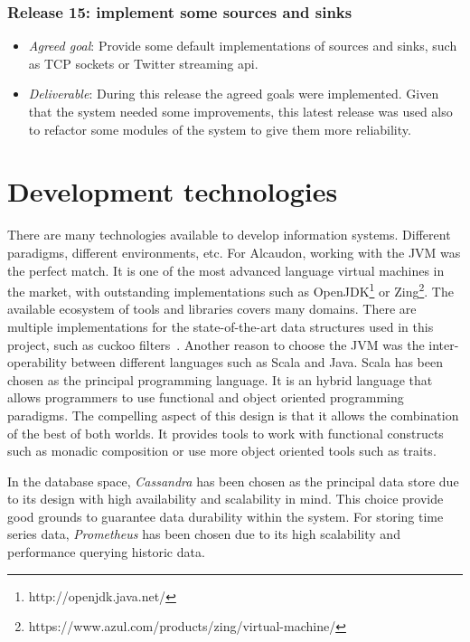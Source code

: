 \subsubsection{Release 15: implement some sources and sinks}
\begin{itemize}
\item \textit{Agreed goal}: Provide some default implementations of sources and
  sinks, such as TCP sockets or Twitter streaming api.
\item \textit{Deliverable}: During this release the agreed goals were implemented. Given
  that the system needed some improvements, this latest release was used also to refactor
  some modules of the system to give them more reliability.
\end{itemize}

\section{Development technologies}

There are many technologies available to develop information systems. Different
paradigms, different environments, etc. For Alcaudon, working with the \acs{JVM}
was the perfect match. It is one of the most advanced language virtual machines
in the market, with outstanding implementations such as
OpenJDK\footnote{http://openjdk.java.net/} or
Zing\footnote{https://www.azul.com/products/zing/virtual-machine/}. The
available ecosystem of tools and libraries covers many domains. There are
multiple implementations for the state-of-the-art data structures used in this
project, such as cuckoo filters~\cite{cuckoo}. Another reason to choose the \acs{JVM}
was the inter-operability between different languages such as Scala and Java.
Scala has been chosen as the principal programming language. It is an hybrid
language that allows programmers to use functional and object oriented
programming paradigms. The compelling aspect of this design is that it allows
the combination of the best of both worlds. It provides tools to work with
functional constructs such as monadic composition or use more object oriented
tools such as traits.

In the database space, \textit{Cassandra} has been chosen as the principal data store due
to its design with high availability and scalability in mind. This choice
provide good grounds to guarantee data durability within the system. For storing
time series data, \textit{Prometheus} has been chosen due to its high scalability and
performance querying historic data.

